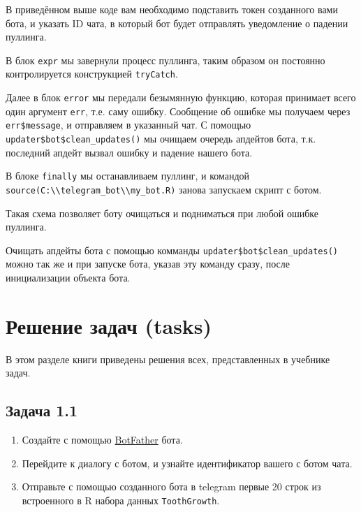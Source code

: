 \documentclass[
]{book}
\providecommand{\tightlist}{%
  \setlength{\itemsep}{0pt}\setlength{\parskip}{0pt}}
\begin{document}
В приведённом выше коде вам необходимо подставить токен созданного вами бота, и указать ID чата, в который бот будет отправлять уведомление о падении пуллинга.

В блок \texttt{expr} мы завернули процесс пуллинга, таким образом он постоянно контролируется конструкцией \texttt{tryCatch}.

Далее в блок \texttt{error} мы передали безымянную функцию, которая принимает всего один аргумент \texttt{err}, т.е. саму ошибку. Сообщение об ошибке мы получаем через \texttt{err\$message}, и отправляем в указанный чат. С помощью \texttt{updater\$bot\$clean\_updates()} мы очищаем очередь апдейтов бота, т.к. последний апдейт вызвал ошибку и падение нашего бота.

В блоке \texttt{finally} мы останавливаем пуллинг, и командой \texttt{source(\textquotesingle{}C:\textbackslash{}\textbackslash{}telegram\_bot\textbackslash{}\textbackslash{}my\_bot.R\textquotesingle{})} занова запускаем скрипт с ботом.

Такая схема позволяет боту очищаться и подниматься при любой ошибке пуллинга.

Очищать апдейты бота с помощью комманды \texttt{updater\$bot\$clean\_updates()} можно так же и при запуске бота, указав эту команду сразу, после инициализации объекта бота.

\hypertarget{ux440ux435ux448ux435ux43dux438ux435-ux437ux430ux434ux430ux447-tasks}{%
\chapter*{Решение задач (tasks)}\label{ux440ux435ux448ux435ux43dux438ux435-ux437ux430ux434ux430ux447-tasks}}

В этом разделе книги приведены решения всех, представленных в учебнике задач.

\hypertarget{ux437ux430ux434ux430ux447ux430-1.1}{%
\section*{Задача 1.1}\label{ux437ux430ux434ux430ux447ux430-1.1}}

\begin{enumerate}
\def\labelenumi{\arabic{enumi}.}
\tightlist
\item
  Создайте с помощью \href{http://t.me/BotFather}{BotFather} бота.
\item
  Перейдите к диалогу с ботом, и узнайте идентификатор вашего с ботом чата.
\item
  Отправьте с помощью созданного бота в telegram первые 20 строк из встроенного в R набора данных \texttt{ToothGrowth}.
\end{enumerate}
\end{document}
